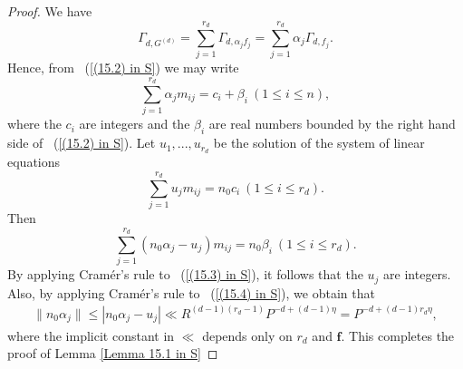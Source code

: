 \documentclass[12pt]{amsart}
\theoremstyle{definition}
\theoremstyle{remark}
\numberwithin{equation}{section}
\begin{document}
\begin{proof}
We have
$$
\Gamma_{d, G^{(d)}} = \sum_{j=1}^{r_d} \Gamma_{d, \alpha_j f_j} = \sum_{j=1}^{r_d} \alpha_j \Gamma_{d, f_j}.
$$
Hence, from ~(\ref{(15.2) in S}) we may write
$$
\sum_{j=1}^{r_d} \alpha_j m_{ij} = c_i + \beta_i \ (1 \leq i \leq n),
$$
where the $c_i$ are integers and the $\beta_i$ are real numbers bounded by the right hand side of ~(\ref{(15.2) in S}).
Let $u_1, ..., u_{r_d}$ be the solution of the system of linear equations
\begin{equation}
\label{(15.3) in S}
\sum_{j=1}^{r_d} u_j m_{ij} = n_0 c_i \ (1 \leq i \leq r_d).
\end{equation}
Then
\begin{equation}
\label{(15.4) in S}
\sum_{j=1}^{r_d} (  n_0 \alpha_j - u_j  )m_{ij} = n_0 \beta_i \ (1 \leq i \leq r_d).
\end{equation}
By applying Cram\'{e}r's rule to ~(\ref{(15.3) in S}), it follows that the $u_j$ are integers. Also, by applying Cram\'{e}r's rule  to ~(\ref{(15.4) in S}),
we obtain that
\begin{eqnarray}
\| n_0 \alpha_j \| \leq | n_0 \alpha_j - u_j | \ll R^{ (d-1)(r_d - 1) }  P^{-d + (d-1) \eta} = P^{ - d + (d-1) r_d \eta } ,
\end{eqnarray}
where the implicit constant in $\ll$ depends only on $r_d$ and $\mathbf{f}$.
This completes the proof of Lemma \ref{Lemma 15.1 in S}
\end{proof}
\end{document}
